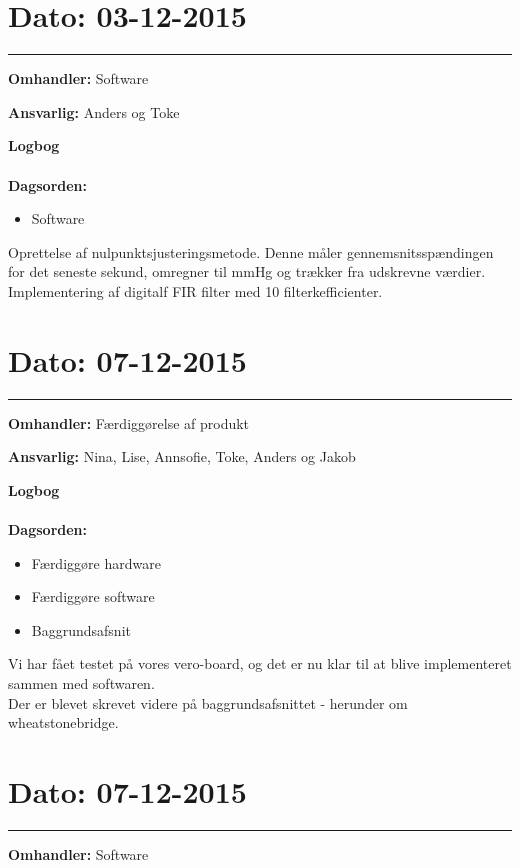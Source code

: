 \section{Dato: 03-12-2015 }
\hrule

\textbf{Omhandler:} Software

\textbf{Ansvarlig:} Anders og Toke

\textbf{Logbog}
\\
\\
\textbf{Dagsorden:}
\begin{itemize}
	\item Software
\end{itemize}

Oprettelse af nulpunktsjusteringsmetode. Denne måler gennemsnitsspændingen for det seneste sekund, omregner til mmHg og trækker fra udskrevne værdier.
Implementering af digitalf FIR filter med 10 filterkefficienter.
	


	
\section{Dato: 07-12-2015 }
\hrule

\textbf{Omhandler:} Færdiggørelse af produkt

\textbf{Ansvarlig:} Nina, Lise, Annsofie, Toke, Anders og Jakob

\textbf{Logbog}
\\
\\
\textbf{Dagsorden:}
\begin{itemize}
	\item Færdiggøre hardware
	\item Færdiggøre software
	\item Baggrundsafsnit
\end{itemize}

Vi har fået testet på vores vero-board, og det er nu klar til at blive implementeret sammen med softwaren. \\
Der er blevet skrevet videre på baggrundsafsnittet - herunder om wheatstonebridge.



\section{Dato: 07-12-2015 }
\hrule

\textbf{Omhandler:} Software

